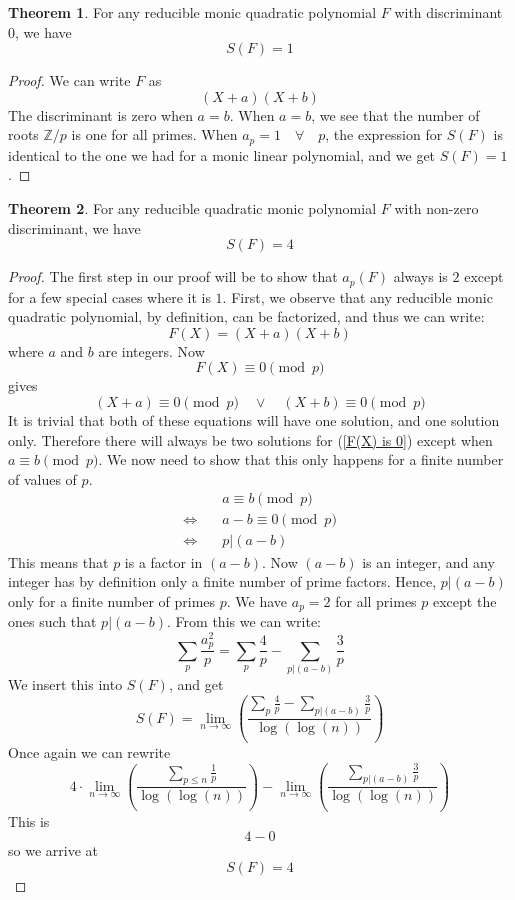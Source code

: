 \documentclass{article}
\theoremstyle{definition}
\newtheorem{theorem}{Theorem}[section]
\theoremstyle{remark}
\begin{document}
\begin{theorem}
For any reducible monic quadratic polynomial $F$ with discriminant $0$, we have
$$S(F)=1$$
\end{theorem}
\begin{proof}
We can write $F$ as
$$(X+a)(X+b)$$
The discriminant is zero when $a=b$.
When $a=b$, we see that the number of roots $\mathbb{Z}/p$ is one for all primes. When $a_p=1 \quad \forall \quad p$, the expression for $S(F)$ is identical to the one we had for a monic linear polynomial, and we get $S(F)=1$.
\end{proof}
\begin{theorem}\label{preben1}
For any reducible quadratic monic polynomial $F$ with non-zero discriminant, we have
$$S(F)=4$$
\end{theorem}
\begin{proof}
The first step in our proof will be to show that $a_p(F)$ always is $2$ except for a few special cases where it is $1$.
First, we observe that any reducible monic quadratic polynomial, by definition, can be factorized, and thus we can write:
$$F(X)=(X+a)(X+b)$$
where $a$ and $b$ are integers.
Now
\begin{equation}\label{F(X) is 0}
F(X) \equiv 0 \pmod{p}
\end{equation}
gives
$$(X+a)\equiv 0 \pmod{p} \quad \vee \quad (X+b) \equiv 0 \pmod{p}$$
It is trivial that both of these equations will have one solution, and one solution only. Therefore there will always be two solutions for (\ref{F(X) is 0}) except when $a\equiv b \pmod{p} $.
We now need to show that this only happens for a finite number of values of $p$.
\begin{equation}
\begin{split}
& a \equiv b \pmod{p} \\
\Leftrightarrow \quad & a-b \equiv 0 \pmod{p} \\
\Leftrightarrow \quad & p \vert (a-b)
\end{split}
\end{equation}
This means that $p$ is a factor in $(a-b)$. Now $(a-b)$ is an integer, and any integer has by definition only a finite number of prime factors. Hence, $p \vert (a-b)$ only for a finite number of primes $p$.
We have $a_p=2$ for all primes $p$ except the ones such that $p \vert (a-b)$. From this we can write:
$$\sum_{p}\frac{a_p^2}{p}=\sum_{p}\frac{4}{p}-\sum_{p \vert (a-b)}\frac{3}{p}$$
We insert this into $S(F)$, and get
$$S(F)=\lim_{n \rightarrow \infty}\left(\frac{\sum_{p}\frac{4}{p}-\sum_{p \vert (a-b)}\frac{3}{p}}{\log(\log(n))} \right)$$
Once again we can rewrite
$$4\cdot \lim_{n \rightarrow \infty}\left(\frac{\sum_{p\leq n}\frac{1}{p}}{\log(\log(n))}\right)-\lim_{n \rightarrow \infty}\left(\frac{\sum_{p \vert (a-b)}\frac{3}{p}}{\log(\log(n))}\right)$$
This is
$$4-0$$
so we arrive at
$$S(F)=4$$
\end{proof}
\end{document}
